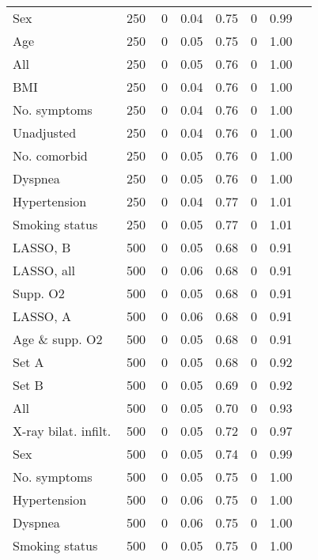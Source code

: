 \documentclass{article}
\begin{document}
{\begin{longtable}{lccccccc}
Sex & 250 & 0 & 0.04 & 0.75 & 0 & 0.99\\
Age & 250 & 0 & 0.05 & 0.75 & 0 & 1.00\\
All & 250 & 0 & 0.05 & 0.76 & 0 & 1.00\\
BMI & 250 & 0 & 0.04 & 0.76 & 0 & 1.00\\
No. symptoms & 250 & 0 & 0.04 & 0.76 & 0 & 1.00\\
Unadjusted & 250 & 0 & 0.04 & 0.76 & 0 & 1.00\\
No. comorbid & 250 & 0 & 0.05 & 0.76 & 0 & 1.00\\
Dyspnea & 250 & 0 & 0.05 & 0.76 & 0 & 1.00\\
Hypertension & 250 & 0 & 0.04 & 0.77 & 0 & 1.01\\
Smoking status & 250 & 0 & 0.05 & 0.77 & 0 & 1.01\\ \midrule
LASSO, B & 500 & 0 & 0.05 & 0.68 & 0 & 0.91\\
LASSO, all & 500 & 0 & 0.06 & 0.68 & 0 & 0.91\\
Supp. O2 & 500 & 0 & 0.05 & 0.68 & 0 & 0.91\\
LASSO, A & 500 & 0 & 0.06 & 0.68 & 0 & 0.91\\
Age \& supp. O2 & 500 & 0 & 0.05 & 0.68 & 0 & 0.91\\
Set A & 500 & 0 & 0.05 & 0.68 & 0 & 0.92\\
Set B & 500 & 0 & 0.05 & 0.69 & 0 & 0.92\\
All & 500 & 0 & 0.05 & 0.70 & 0 & 0.93\\
X-ray bilat. infilt. & 500 & 0 & 0.05 & 0.72 & 0 & 0.97\\
Sex & 500 & 0 & 0.05 & 0.74 & 0 & 0.99\\
No. symptoms & 500 & 0 & 0.05 & 0.75 & 0 & 1.00\\
Hypertension & 500 & 0 & 0.06 & 0.75 & 0 & 1.00\\
Dyspnea & 500 & 0 & 0.06 & 0.75 & 0 & 1.00\\
Smoking status & 500 & 0 & 0.05 & 0.75 & 0 & 1.00\\
BMI & 500 & 0 & 0.06 & 0.75 & 0 & 1.00\\
Unadjusted & 500 & 0 & 0.06 & 0.75 & 0 & 1.00\\
No. comorbid & 500 & 0 & 0.06 & 0.75 & 0 & 1.00\\
Age & 500 & 0 & 0.06 & 0.75 & 0 & 1.00\\ \midrule
LASSO, A & 1500 & 0 & 0.04 & 0.66 & 0 & 0.87\\
LASSO, all & 1500 & 0 & 0.04 & 0.66 & 0 & 0.87\\

\end{longtable}}
\end{document}
